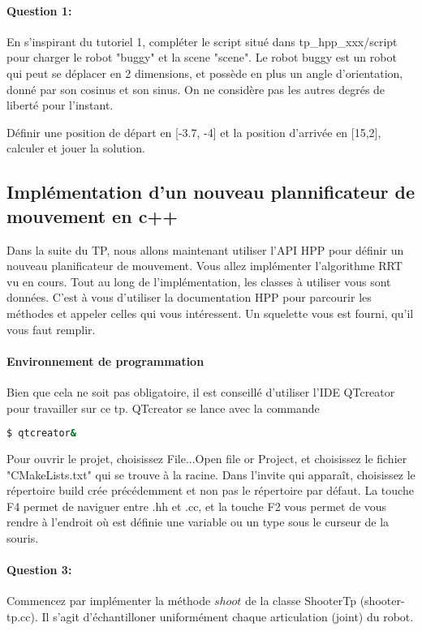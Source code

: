 \documentclass {article}
\begin{document}
\paragraph {Question 1:}
En s'inspirant du tutoriel 1, compl\'eter le script situ\'e dans tp\_hpp\_xxx/script pour 
charger le robot "buggy" et la scene "scene".
Le robot buggy est un robot qui peut se d\'eplacer en 2 dimensions, et poss\`ede en plus un angle
d'orientation, donn\'e par son cosinus et son sinus. On ne consid\`ere pas les autres degr\'es de
libert\'e pour l'instant.

D\'efinir une position de d\'epart en [-3.7, -4] et la position d'arriv\'ee en [15,2],
calculer et jouer la solution.

\subsection{Impl\'ementation d'un nouveau plannificateur de mouvement en c++}
Dans la suite du TP, nous allons maintenant utiliser l'API HPP pour d\'efinir un nouveau planificateur de mouvement.
Vous allez impl\'ementer l'algorithme RRT vu en cours.
Tout au long de l'impl\'ementation, les classes \`a utiliser vous sont donn\'ees.
C'est \`a vous d'utiliser la documentation HPP pour parcourir les m\'ethodes et appeler celles qui vous int\'eressent.
Un squelette vous est fourni, qu'il vous faut remplir.

\paragraph{Environnement de programmation}
Bien que cela ne soit pas obligatoire, il est conseill\'e d'utiliser l'IDE QTcreator pour travailler sur ce tp.
QTcreator se lance avec la commande 
\begin{lstlisting}[language=bash]
  $ qtcreator&
\end{lstlisting}

Pour ouvrir le projet, choisissez File...Open file or Project, et choisissez le fichier "CMakeLists.txt"
qui se trouve \`a la racine. Dans l'invite qui appara\^it, choisissez le r\'epertoire build cr\'ee pr\'ec\'edemment et non
pas le r\'epertoire par d\'efaut. La touche F4 permet de naviguer entre .hh et .cc, et la touche F2 vous 
permet de vous rendre \`a l'endroit o\`u est d\'efinie une variable ou un type sous le curseur de la souris.

\paragraph {Question 3:}
Commencez par impl\'ementer la m\'ethode $shoot$ de la classe ShooterTp (shooter-tp.cc).
Il s'agit d'\'echantilloner uniform\'ement chaque articulation (joint) du robot.
\end{document}
